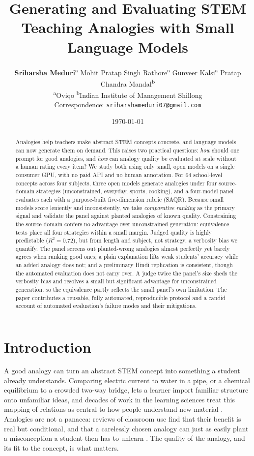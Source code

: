 \documentclass[11pt]{article}
\title{\bfseries Generating and Evaluating STEM Teaching Analogies with Small Language Models}
\author{\textbf{Sriharsha Meduri}\textsuperscript{a} \quad Mohit Pratap Singh Rathore\textsuperscript{a} \quad
  Gunveer Kalsi\textsuperscript{a} \quad Pratap Chandra Mandal\textsuperscript{b} \\[3pt]
  \small \textsuperscript{a}Oviqo \qquad \textsuperscript{b}Indian Institute of Management Shillong \\[2pt]
  \small Correspondence: \texttt{sriharshameduri07@gmail.com}}
\date{\today}
\newcommand{\result}[1]{#1}  %
\begin{document}
\pagestyle{plain}
\maketitle
\thispagestyle{plain}

\begin{abstract}
\noindent
Analogies help teachers make abstract STEM concepts concrete, and language models
can now generate them on demand. This raises two practical questions: \emph{how}
should one prompt for good analogies, and \emph{how} can analogy quality be evaluated
at scale without a human rating every item? We study both using only small, open
models on a single consumer GPU, with no paid API and no human annotation. For
\result{64} school-level concepts across four subjects, three open models generate
analogies under four source-domain strategies (unconstrained, everyday, sports,
cooking), and a four-model panel evaluates each with a purpose-built five-dimension
rubric (SAQR). Because small models score leniently and inconsistently, we take
\emph{comparative ranking} as the primary signal and validate the panel against
planted analogies of known quality. Constraining the source domain confers no
advantage over unconstrained generation: equivalence tests place all four strategies
within a small margin. Judged quality is highly predictable ($R^2 = 0.72$), but from
length and subject, not strategy, a verbosity bias we quantify. The panel screens out
planted-wrong analogies almost perfectly yet barely agrees when ranking good ones; a plain
explanation lifts weak students' accuracy while an added analogy does not; and a preliminary Hindi
replication is consistent, though the automated evaluation does not carry over. A judge twice the
panel's size sheds the verbosity bias and resolves a small but significant advantage for
unconstrained generation, so the equivalence partly reflects the small panel's own limitation. The paper contributes a reusable, fully automated, reproducible
protocol and a candid account of automated evaluation's failure modes and their mitigations.
\end{abstract}

\section{Introduction}
\label{sec:intro}
A good analogy can turn an abstract STEM concept into something a student already
understands. Comparing electric current to water in a pipe, or a chemical
equilibrium to a crowded two-way bridge, lets a learner import familiar structure
onto unfamiliar ideas, and decades of work in the learning sciences treat this
mapping of relations as central to how people understand new material
\citep{gentner1983structure,duit1991role}. Analogies are not a panacea: reviews of
classroom use find that their benefit is real but conditional, and that a
carelessly chosen analogy can just as easily plant a misconception a student then
has to unlearn \citep{dagher1995review,clement1993bridging}. The quality of the
analogy, and its fit to the concept, is what matters.
\end{document}
